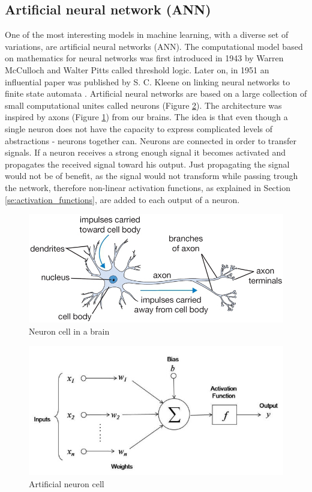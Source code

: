 \documentclass[times, utf8, diplomski]{fer}
\begin{document}
\subsection{Artificial neural network (ANN)}
One of the most interesting models in machine learning, with a diverse set of variations, are artificial neural networks (ANN). The computational model based on mathematics for neural networks was first introduced in 1943 by Warren McCulloch and Walter Pitts \citep{mcculloch_logical_1943}  called threshold logic. Later on, in 1951 an influential paper was published by S. C. Kleene on linking neural networks to finite state automata \citep{kleene_representation_1951}. Artificial neural networks are based on a large collection of small computational unites called neurons (Figure  \ref{fig:ann_neuron}). The architecture was inspired by axons (Figure \ref{fig:neuron}) from our brains. The idea is that even though a single neuron does not have the capacity to express complicated levels of abstractions - neurons together can. Neurons are connected in order to transfer signals. If a neuron receives a strong enough signal it becomes activated and propagates the received signal toward his output. Just propagating the signal would not be of benefit, as the signal would not transform while passing trough the network, therefore non-linear activation functions, as explained in Section \ref{se:activation_functions}, are added to each output of a neuron.

\begin{figure}
  \includegraphics[width=\linewidth]{figures/axon.png}
  \caption{Neuron cell in a brain}
  \label{fig:neuron}
\end{figure}

\begin{figure}
  \includegraphics[width=\linewidth]{figures/neuron.jpg}
  \caption{Artificial neuron cell}
  \label{fig:ann_neuron}
\end{figure}
\end{document}
